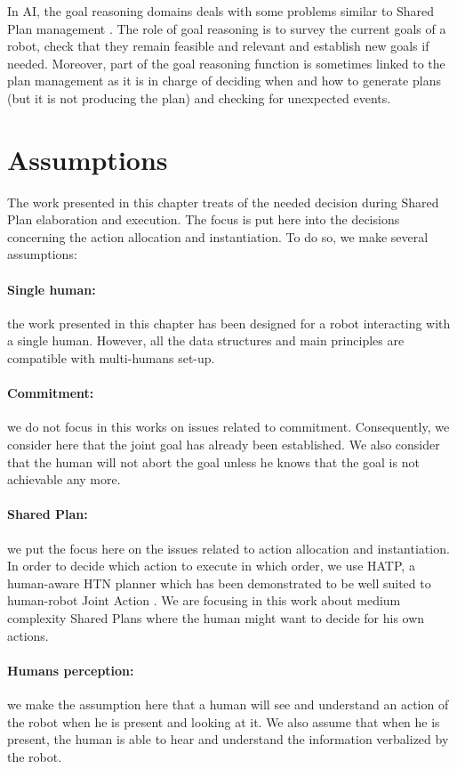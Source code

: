 \documentclass[english,a4paper,11pt,twoside]{StyleThese}
\begin{document}
In AI, the goal reasoning domains deals with some problems similar to Shared Plan management \cite{molineaux2010goal, roberts2016goal}. The role of goal reasoning is to survey the current goals of a robot, check that they remain feasible and relevant and establish new goals if needed. Moreover, part of the goal reasoning function is sometimes linked to the plan management as it is in charge of deciding when and how to generate plans (but it is not producing the plan) and checking for unexpected events. 

\section{Assumptions}

The work presented in this chapter treats of the needed decision during Shared Plan elaboration and execution. The focus is put here into the decisions concerning the action allocation and instantiation. To do so, we make several assumptions:

\paragraph{Single human:} the work presented in this chapter has been designed for a robot interacting with a single human. However, all the data structures and main principles are compatible with multi-humans set-up.

\paragraph{Commitment:} we do not focus in this works on issues related to commitment. Consequently, we consider here that the joint goal has already been established. We also consider that the human will not abort the goal unless he knows that the goal is not achievable any more.

\paragraph{Shared Plan:} we put the focus here on the issues related to action allocation and instantiation. In order to decide which action to execute in which order, we use HATP, a human-aware HTN planner which has been demonstrated to be well suited to human-robot Joint Action \cite{Lallement2014hatp}.
We are focusing in this work about medium complexity Shared Plans where the human might want to decide for his own actions.

\paragraph{Humans perception:} we make the assumption here that a human will see and understand an action of the robot when he is present and looking at it. We also assume that when he is present, the human is able to hear and understand the information verbalized by the robot.
\end{document}
